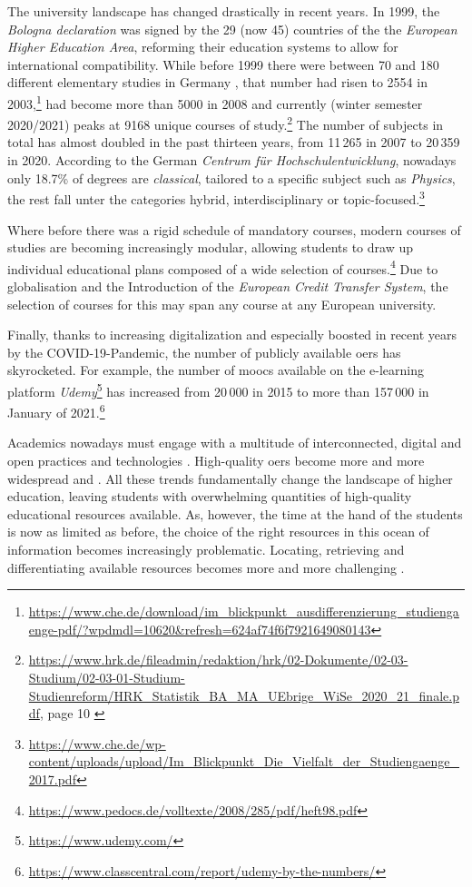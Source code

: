 The university landscape has changed drastically in recent years. In 1999, the \textit{Bologna declaration} was signed by the 29 (now 45) countries of the the \textit{European Higher Education Area}, reforming their education systems to allow for international compatibility. While before 1999 there were between 70 and 180 different elementary studies in Germany \cite{Schroder2015}, that number had risen to 2554 in 2003,\footnote{\url{https://www.che.de/download/im_blickpunkt_ausdifferenzierung_studiengaenge-pdf/?wpdmdl=10620&refresh=624af74f6f7921649080143}} had become more than 5000 in 2008 and currently (winter semester 2020/2021) peaks at 9168 unique courses of study.\footnote{\url{https://www.hrk.de/fileadmin/redaktion/hrk/02-Dokumente/02-03-Studium/02-03-01-Studium-Studienreform/HRK_Statistik_BA_MA_UEbrige_WiSe_2020_21_finale.pdf}, page 10 \label{fnote:degreenums}} The number of subjects in total has almost doubled in the past thirteen years, from 11\,265 in 2007 to 20\,359 in 2020. According to the German \textit{Centrum für Hochschulentwicklung}, nowadays only 18.7\% of degrees are \textit{classical}, \ie tailored to a specific subject such as \textit{Physics}, the rest fall unter the categories hybrid, interdisciplinary or topic-focused.\footnote{\url{https://www.che.de/wp-content/uploads/upload/Im_Blickpunkt_Die_Vielfalt_der_Studiengaenge_2017.pdf}}

Where before there was a rigid schedule of mandatory courses, modern courses of studies are becoming increasingly modular, allowing students to draw up individual educational plans composed of a wide selection of courses.\footnote{\url{https://www.pedocs.de/volltexte/2008/285/pdf/heft98.pdf}} Due to globalisation and the Introduction of the \emph{European Credit Transfer System}, the selection of courses for this may span any course at any European university.

Finally, thanks to increasing digitalization and especially boosted in recent years by the COVID-19-Pandemic, the number of publicly available \glspl{oer} has skyrocketed. For example, the number of \glspl{mooc} available on the e-learning platform \textit{Udemy}\footnote{\url{https://www.udemy.com/}} has increased from 20\,000 in 2015 to more than 157\,000 in January of 2021.\footnote{\url{https://www.classcentral.com/report/udemy-by-the-numbers/}}

Academics nowadays must engage with a multitude of interconnected, digital and open practices and technologies \cite{Atenas2014}. High-quality \glspl{oer} become more and more widespread and  \cite[2]{Olcott2012}. All these trends fundamentally change the landscape of higher education, leaving students with overwhelming quantities of high-quality educational resources available. As, however, the time at the hand of the students is now as limited as before, the choice of the right resources in this ocean of information becomes increasingly problematic. Locating, retrieving and differentiating available resources becomes more and more challenging \cite{Atenas2014}.

